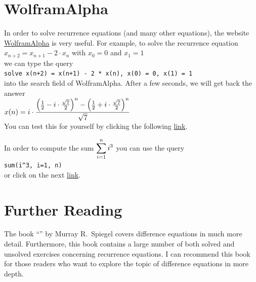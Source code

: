 \section{WolframAlpha}
In order to solve recurrence equations (and many other equations), the website \href{https://www.wolframalpha.com/}{WolframAlpha}
 is very useful.  For example, to solve the recurrence equation
\\[0.2cm]
\hspace*{1.3cm}
$x_{n+2} = x_{n+1} - 2 \cdot x_n$ \quad with $x_0 = 0$ and $x_1 = 1$ 
\\[0.2cm]
we can type the query
\\[0.2cm]
\hspace*{1.3cm}
\texttt{solve x(n+2) = x(n+1) - 2 * x(n), x(0) = 0, x(1) = 1}
\\[0.2cm]
into the search field of WolframAlpha.  After a few seconds, we will get back the answer
\\[0.2cm]
\hspace*{1.3cm}
$\displaystyle x(n) = i \cdot \frac{\left(\frac{1}{2} - i \cdot\frac{\sqrt{7}}{2}\right)^n -
                          \left(\frac{1}{2} + i \cdot\frac{\sqrt{7}}{2}\right)^n}{\sqrt{7}}$
\\[0.2cm]
You can test this for yourself by clicking the following                        
\href{https://www.wolframalpha.com/input?i=solve+x%28n%2B2%29+%3D+x%28n%2B1%29+-+2+*+x%28n%29%2C+x%280%29+%3D+0%2C+x%281%29+%3D+1}{link}.

In order to compute the sum $\displaystyle\sum\limits_{i=1}^n i^3$ you can use the query
\\[0.2cm]
\hspace*{1.3cm}
\texttt{sum(i\^{ }3, i=1, n)}
\\[0.2cm]
or click on the next \href{https://www.wolframalpha.com/input?i=sum%28i%5E3%2C+i%3D1%2C+n%29}{link}.




\section{Further Reading}
The book ``'' by Murray R.~Spiegel
\cite{spiegel:1971} covers difference equations in much more detail.  Furthermore, this book contains a large
number of both solved and unsolved exercises concerning recurrence equations. 
I can recommend this book for those readers who want to explore the topic of difference equations in more depth.


